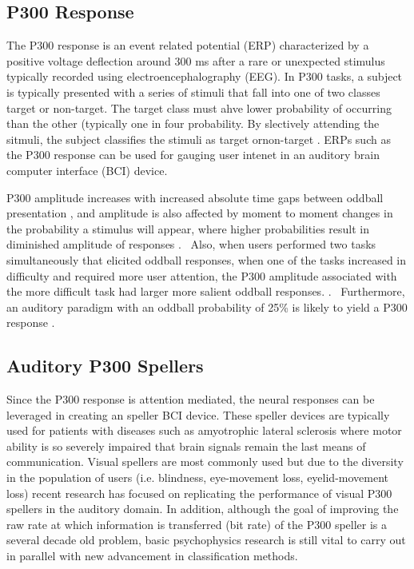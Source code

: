 \documentclass[10pt]{article}
\begin{document}
\subsection{P300 Response} 
The P300 response is an event related
potential (ERP) characterized by a positive voltage deflection
around 300 ms after a rare or unexpected stimulus typically recorded
using electroencephalography (EEG). In P300 tasks, a subject is
typically presented with a series of stimuli that fall into one of
two classes target or non-target.  The target class must ahve lower
probability of occurring than the other (typically one in four
probability.  By slectively attending the sitmuli, the subject
classifies the stimuli as target ornon-target \cite{Wolpaw2012}.
ERPs such as the P300 response can be used for gauging user intenet
in an auditory brain computer interface (BCI) device.

P300 amplitude increases with increased absolute
time gaps between oddball presentation \cite{GONSALVEZ2002}, and
amplitude is also affected by moment to moment changes in the
probability a stimulus will appear, where higher probabilities
result in diminished amplitude of responses \cite{Donchin1981}.
 Also, when users performed two tasks simultaneously that elicited
oddball responses, when one of the tasks increased in difficulty and
required more user attention, the P300 amplitude associated with the
more difficult task had larger more salient oddball responses.
\cite{Sirevaag1989}.  Furthermore, an auditory paradigm with an
oddball probability of 25\% is likely to yield a P300 response
\cite{Nijboer2008}. 

\subsection{Auditory P300 Spellers} 
Since the P300 response is attention mediated, the neural responses
can be leveraged in creating an speller BCI device. These speller
devices are typically used for patients with diseases such as
amyotrophic lateral sclerosis where motor ability is so severely
impaired that brain signals remain the last means of
communication\cite{Nijboer2008}.  Visual spellers are most commonly
used but due to the diversity in the population of users (i.e.
blindness, eye-movement loss, eyelid-movement loss) recent research
has focused on replicating the performance of visual P300 spellers
in the auditory domain.  In addition, although the goal of improving
the raw rate at which information is transferred (bit rate) of
the P300 speller is a several decade old problem, basic
psychophysics research is still vital to carry out in parallel with
new advancement in classification methods.
\end{document}
